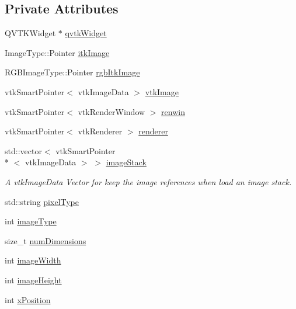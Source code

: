 \subsection*{Private Attributes}
\begin{DoxyCompactItemize}
\item 
Q\-V\-T\-K\-Widget $\ast$ \hyperlink{class_q_v_t_k_image_widget_a461f6ca20211ec9ff4b367aeb95e8139}{qvtk\-Widget}
\item 
Image\-Type\-::\-Pointer \hyperlink{class_q_v_t_k_image_widget_ae5b308466d4f198990b9d132319f9f34}{itk\-Image}
\item 
R\-G\-B\-Image\-Type\-::\-Pointer \hyperlink{class_q_v_t_k_image_widget_ae8cea614979ccdb6fe65551c8269b116}{rgb\-Itk\-Image}
\item 
vtk\-Smart\-Pointer$<$ vtk\-Image\-Data $>$ \hyperlink{class_q_v_t_k_image_widget_aa55aaf6e037ee4d789449ff3d365201b}{vtk\-Image}
\item 
vtk\-Smart\-Pointer$<$ vtk\-Render\-Window $>$ \hyperlink{class_q_v_t_k_image_widget_a1ffdb2716a14bd2cb4dc845c50fc474c}{renwin}
\item 
vtk\-Smart\-Pointer$<$ vtk\-Renderer $>$ \hyperlink{class_q_v_t_k_image_widget_a06c273e6e390e8e860fa4c0c932a2cf8}{renderer}
\item 
std\-::vector$<$ vtk\-Smart\-Pointer\\*
$<$ vtk\-Image\-Data $>$ $>$ \hyperlink{class_q_v_t_k_image_widget_a336708e27578dab885b069f12c120138}{image\-Stack}
\begin{DoxyCompactList}\small\item\em A vtk\-Image\-Data Vector for keep the image references when load an image stack. \end{DoxyCompactList}\item 
std\-::string \hyperlink{class_q_v_t_k_image_widget_a067b78e68ed458d840ad1cf0d16b4ad6}{pixel\-Type}
\item 
int \hyperlink{class_q_v_t_k_image_widget_a132867322988e692c324f5cc66697341}{image\-Type}
\item 
size\-\_\-t \hyperlink{class_q_v_t_k_image_widget_a6aff403421ea538248d48116a942271b}{num\-Dimensions}
\item 
int \hyperlink{class_q_v_t_k_image_widget_a1ab611f7637a7885347b07ba9aa42e22}{image\-Width}
\item 
int \hyperlink{class_q_v_t_k_image_widget_acc1b249b96b147b447366361331ef60a}{image\-Height}
\item 
int \hyperlink{class_q_v_t_k_image_widget_afd88ea5dbed175232b0c15cbe4cdca89}{x\-Position}

\end{DoxyCompactItemize}
